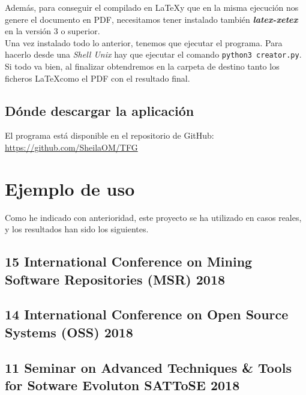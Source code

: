 \documentclass[a4paper, 12pt]{book}
\begin{document}
Además, para conseguir el compilado en \LaTeX y que en la misma ejecución nos genere el documento en PDF, necesitamos tener instalado también \textbf{\textit{latex-xetex}} en la versión 3 o superior.\\

Una vez instalado todo lo anterior, tenemos que ejecutar el programa. Para hacerlo desde una \textit{Shell Unix} hay que ejecutar el comando \verb"python3 creator.py". Si todo va bien, al finalizar obtendremos en la carpeta de destino tanto los ficheros \LaTeX como el PDF con el resultado final.

\section{Dónde descargar la aplicación}
\label{sec:descarga_aplicacion}
El programa está disponible en el repositorio de GitHub:\\
\url{https://github.com/SheilaOM/TFG}


\cleardoublepage
\chapter{Ejemplo de uso}
\label{app:ejemplos}
Como he indicado con anterioridad, este proyecto se ha utilizado en casos reales, y los resultados han sido los siguientes.

\newpage
\section{15 International Conference on Mining Software Repositories (MSR) 2018}
\label{MSR}



\section{14 International Conference on Open Source Systems (OSS) 2018}
\label{OSS}



\section{11 Seminar on Advanced Techniques \& Tools for Sotware Evoluton SATToSE 2018}
\label{SATToSE}



\end{document}
